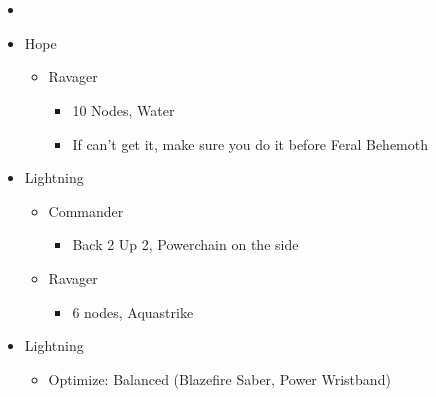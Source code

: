 \chapter{}

\begin{menu}
\begin{itemize}
    \paradigm
    \begin{itemize}
        \item {}%
{\paradigmline{\textit{\rav}}{\textit{\com}}{}}%
{\paradigmline{(\med)}{(\com)}{}}%
{\paradigmline{\syn}{(\rav)}{}}%
{\paradigmline{\rav}{\rav}{}}%
{\paradigmline{\rav}{[\rav]}{}}%
{\paradigmline{[\rav]}{\com}{}}
    \end{itemize}
    \crystarium
    \begin{itemize}
        \item Hope
        \begin{itemize}
            \item Ravager
            \begin{itemize}
                \item 10 Nodes, Water
                \item If can't get it, make sure you do it before Feral Behemoth
            \end{itemize}
        \end{itemize}
        \item Lightning
        \begin{itemize}
            \item Commander
            \begin{itemize}
                \item Back 2 Up 2, Powerchain on the side
            \end{itemize}
            \item Ravager
            \begin{itemize}
                \item 6 nodes, Aquastrike
            \end{itemize}
        \end{itemize}
    \end{itemize}
    \equip
    \begin{itemize}
        \item Lightning
        \begin{itemize}
            \item Optimize: Balanced (Blazefire Saber, Power Wristband)
        \end{itemize}
    \end{itemize}
\end{itemize}
\end{menu}

